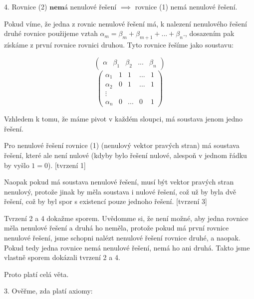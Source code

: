 \documentclass[10pt,a4paper]{article}
\begin{document}
4. Rovnice (2) $\textbf{nemá}$ nenulové řešení $\implies$ rovnice (1) nemá nenulové řešení.

\hfill

Pokud víme, že jedna z rovnic nenulové řešení má, k nalezení nenulového řešení druhé rovnice použijeme vztah $\alpha_m = \beta_m + \beta_{m+1} + ... + \beta_n$., dosazením pak získáme z první rovnice rovnici druhou.
Tyto rovnice řešíme jako soustavu:

\begin{equation*}
\left(
\begin{array}{c|cccc}
\alpha & \beta_1 & \beta_2 & ... & \beta_n
\end{array}
\right)
\end{equation*}
\begin{equation*}
\left(
\begin{array}{c|cccc}
\alpha_1 & 1 & 1 & ... & 1 \\
\alpha_2 & 0 &  1 & ... & 1 \\
\vdots \\
\alpha_n & 0 & ... & 0 & 1
\end{array}
\right)
\end{equation*}

Vzhledem k tomu, že máme pivot v každém sloupci, má soustava jenom jedno řešení.

Pro nenulové řešení rovnice (1) (nenulový vektor pravých stran) má soustava řešení, které ale není nulové (kdyby bylo řešení nulové, alespoň v jednom řádku by vyšlo $1=0$). [tvrzení 1]

Naopak pokud má soustava nenulové řešení, musí být vektor pravých stran nenulový, protože jinak by měla soustava i nulové řešení, což už by byla dvě řešení, což by byl spor s existencí pouze jednoho řešení. [tvrzení 3]

Tvrzení 2 a 4 dokažme sporem. Uvědomme si, že není možné, aby jedna rovnice měla nenulové řešení a druhá ho neměla, protože pokud má první rovnice nenulové řešení, jsme schopni nalézt nenulové řešení rovnice druhé, a naopak. Pokud tedy jedna rovnice nemá nenulové řešení, nemá ho ani druhá. Takto jsme vlastně sporem dokázali tvrzení 2 a 4.

Proto platí celá věta.

\hfill

3.
Ověřme, zda platí axiomy:
\end{document}
